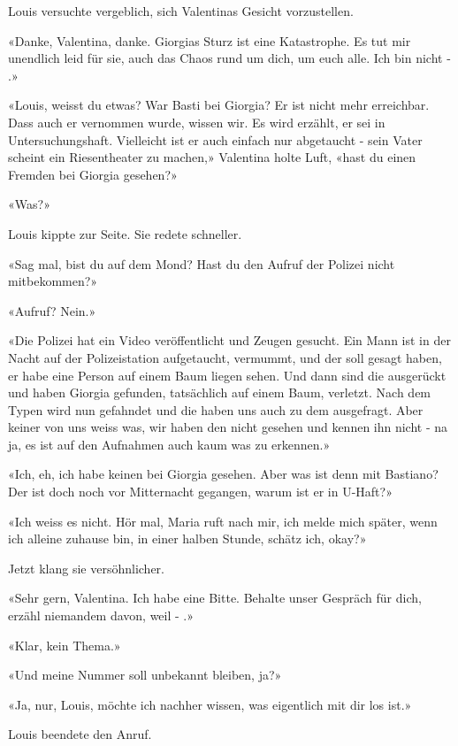 Louis versuchte vergeblich, sich Valentinas Gesicht vorzustellen.

«Danke, Valentina, danke. Giorgias Sturz ist eine Katastrophe. Es tut
mir unendlich leid für sie, auch das Chaos rund um dich, um euch alle.
Ich bin nicht - .»

«Louis, weisst du etwas? War Basti bei Giorgia? Er ist nicht mehr
erreichbar. Dass auch er vernommen wurde, wissen wir. Es wird erzählt,
er sei in Untersuchungshaft. Vielleicht ist er auch einfach nur abgetaucht - sein Vater scheint ein Riesentheater zu
machen,» Valentina holte Luft, «hast du einen Fremden bei Giorgia
gesehen?»

«Was?»

Louis kippte zur Seite. Sie redete schneller.

«Sag mal, bist du auf dem Mond? Hast du den Aufruf der Polizei nicht
mitbekommen?»

«Aufruf? Nein.»

«Die Polizei hat ein Video veröffentlicht und Zeugen gesucht. Ein Mann
ist in der Nacht auf der Polizeistation aufgetaucht, vermummt, und der
soll gesagt haben, er habe eine Person auf einem Baum liegen sehen.
Und dann sind die ausgerückt und haben Giorgia gefunden, tatsächlich auf
einem Baum, verletzt. Nach dem Typen wird nun gefahndet und die haben
uns auch zu dem ausgefragt. Aber keiner von uns weiss was, wir haben den
nicht gesehen und kennen ihn nicht - na ja, es ist auf den Aufnahmen auch
kaum was zu erkennen.»

«Ich, eh, ich habe keinen bei Giorgia gesehen. Aber was ist denn mit
Bastiano? Der ist doch noch vor Mitternacht gegangen, warum ist er in
U-Haft?»

«Ich weiss es nicht. Hör mal, Maria ruft nach mir, ich melde mich
später, wenn ich alleine zuhause bin, in einer halben Stunde, schätz
ich, okay?»

Jetzt klang sie versöhnlicher.

«Sehr gern, Valentina. Ich habe eine Bitte. Behalte unser Gespräch für
dich, erzähl niemandem davon, weil - .»

«Klar, kein Thema.»

«Und meine Nummer soll unbekannt bleiben, ja?»

«Ja, nur, Louis, möchte ich nachher wissen, was eigentlich mit dir los
ist.»

Louis beendete den Anruf.
